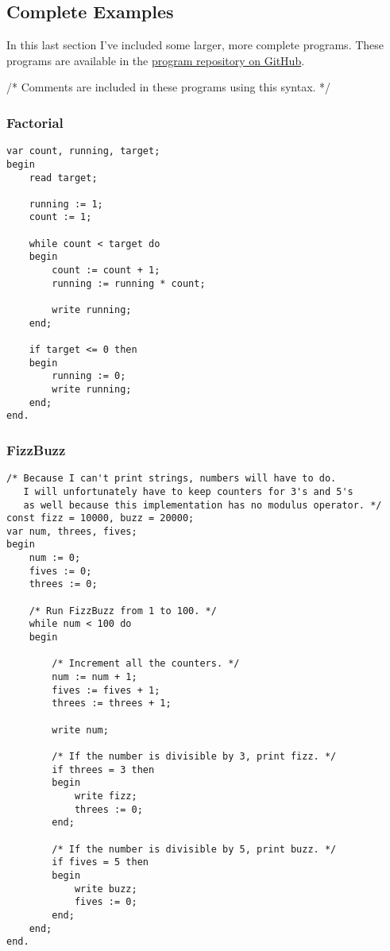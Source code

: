 \documentclass[12pt]{memoir}
\begin{document}
\subsection*{Complete Examples}
In this last section I've included some larger, more complete programs. These programs
are available in the \href{https://www.github.com/tgsachse/plum}{program repository on GitHub}.

/* Comments are included in these programs using this syntax. */

\subsubsection*{Factorial}
\begin{lstlisting}
var count, running, target;
begin
    read target;

    running := 1;
    count := 1;

    while count < target do
    begin
        count := count + 1;
        running := running * count;
        
        write running;
    end;

    if target <= 0 then
    begin
        running := 0;
        write running;
    end;
end.
\end{lstlisting}

\pagebreak

\subsubsection*{FizzBuzz}
\begin{lstlisting}
/* Because I can't print strings, numbers will have to do.
   I will unfortunately have to keep counters for 3's and 5's
   as well because this implementation has no modulus operator. */
const fizz = 10000, buzz = 20000;
var num, threes, fives;
begin
    num := 0;
    fives := 0;
    threes := 0;
    
    /* Run FizzBuzz from 1 to 100. */
    while num < 100 do
    begin

        /* Increment all the counters. */
        num := num + 1;
        fives := fives + 1;
        threes := threes + 1;
    
        write num;

        /* If the number is divisible by 3, print fizz. */
        if threes = 3 then
        begin
            write fizz;
            threes := 0;
        end;

        /* If the number is divisible by 5, print buzz. */
        if fives = 5 then
        begin
            write buzz;
            fives := 0;
        end;
    end;
end.
\end{lstlisting}
\end{document}
